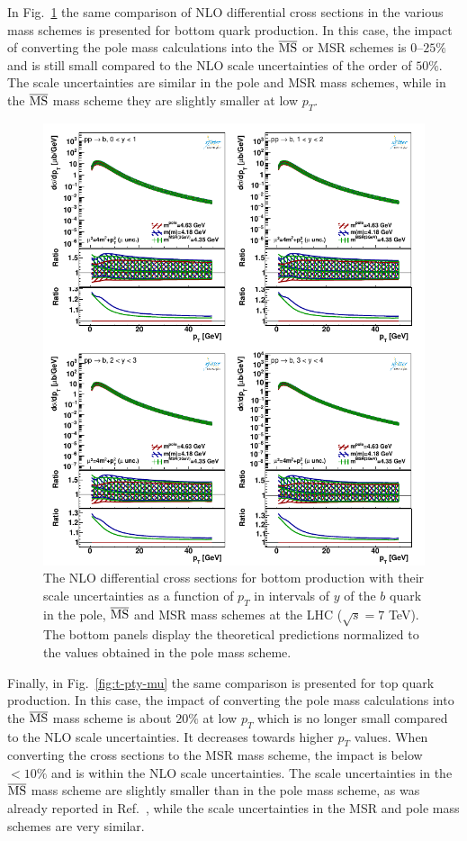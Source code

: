 \documentclass[12pt,a4paper]{article}
\newcommand{\msbar}{\ensuremath{\overline{\rm MS}}\xspace}
\begin{document}
In Fig.~\ref{fig:b-pty-mu} the same comparison of NLO differential cross sections in the various mass schemes is presented for bottom quark production. In this case, the impact of converting the pole mass calculations into the \msbar or MSR schemes is $0\textrm{--}25\%$ and is still small compared to the NLO scale uncertainties of the order of $50\%$. The scale uncertainties are similar in the pole and MSR mass schemes, while in the \msbar mass scheme they are slightly smaller at low $p_T$.

\begin{figure}
    \centering
    \includegraphics[width=1.00\textwidth]{figs/parton-b/dyn-therr3-all.pdf}
    \caption{The NLO differential cross sections for bottom production with their scale uncertainties as a function of $p_T$ in intervals of $y$ of the $b$ quark in the pole, \msbar and MSR mass schemes at the LHC ($\sqrt{s} = 7$ TeV). The bottom panels display the theoretical predictions normalized to the values obtained in the pole mass scheme.}
    \label{fig:b-pty-mu}
\end{figure}

Finally, in Fig.~\ref{fig:t-pty-mu} the same comparison is presented for top quark production. In this case, the impact of converting the pole mass calculations into the \msbar mass scheme is about $20\%$ at low $p_T$ which is no longer small compared to the NLO scale uncertainties. It decreases towards higher $p_T$ values. When converting the cross sections to the MSR mass scheme, the impact is below $<10\%$ and is within the NLO scale uncertainties. The scale uncertainties in the \msbar mass scheme are slightly smaller than in the pole mass scheme, as was already reported in Ref.~\cite{Dowling:2013baa}, while the scale uncertainties in the MSR and pole mass schemes are very similar.
\end{document}
